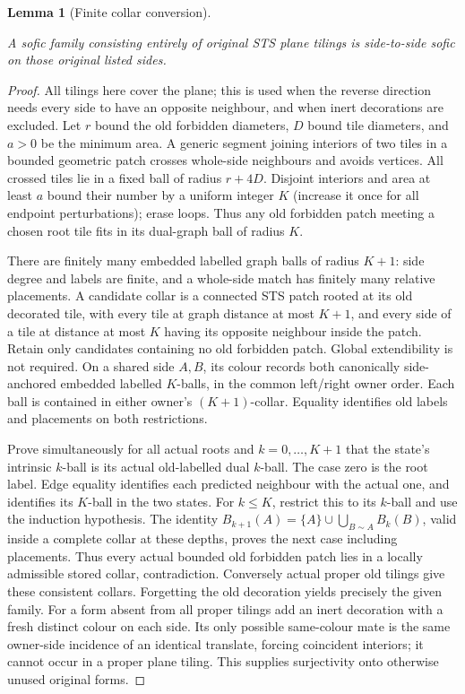 \documentclass[11pt,a4paper]{article}
\newtheorem{lemma}[definition]{Lemma}
\theoremstyle{remark}
\newcommand{\lean}[1]{}
\newcommand{\uses}[1]{}
\begin{document}
\begin{lemma}[Finite collar conversion]\label{lem:collar-conversion}
\lean{Tilings.LocalRule.side_presentation_of_sts_sofic}
\uses{def:localrule,def:sofic,def:sts,def:mesh,lem:localfinite}
A sofic family consisting entirely of original STS plane tilings is
side-to-side sofic on those original listed sides.
\end{lemma}
\begin{proof}
All tilings here cover the plane; this is used when the reverse direction
needs every side to have an opposite neighbour, and when inert decorations
are excluded. Let $r$ bound the old forbidden diameters, $D$ bound tile
diameters, and $a>0$ be the minimum area. A generic segment joining interiors of two
tiles in a bounded geometric patch crosses whole-side neighbours and avoids
vertices. All crossed tiles lie in a fixed ball of radius $r+4D$.
Disjoint interiors and area at least $a$ bound their number by a uniform
integer $K$ (increase it once for all endpoint perturbations); erase loops.
Thus any old forbidden patch meeting a chosen root tile fits in its
dual-graph ball of radius $K$.

There are finitely many embedded labelled graph balls of radius $K+1$:
side degree and labels are finite, and a whole-side match has finitely many
relative placements. A candidate collar is a connected STS patch rooted at
its old decorated tile, with every tile at graph distance at most $K+1$,
and every side of a tile at distance at most $K$ having its opposite
neighbour inside the patch. Retain only candidates containing no old
forbidden patch. Global extendibility is not required.
On a shared side $A,B$, its colour records both canonically side-anchored
embedded labelled $K$-balls, in the common left/right owner order. Each
ball is contained in either owner's $(K+1)$-collar. Equality identifies
old labels and placements on both restrictions.

Prove simultaneously for all actual roots and $k=0,\ldots,K+1$ that the
state's intrinsic $k$-ball is its actual old-labelled dual $k$-ball.
The case zero is the root label. Edge equality identifies each predicted
neighbour with the actual one, and identifies its $K$-ball in the two
states. For $k\leq K$, restrict this to its $k$-ball and use the induction
hypothesis. The identity
$B_{k+1}(A)=\{A\}\cup\bigcup_{B\sim A}B_k(B)$, valid inside a complete
collar at these depths, proves the next case including placements.
Thus every actual bounded old forbidden patch lies in a locally admissible
stored collar, contradiction. Conversely actual proper old tilings give
these consistent collars. Forgetting the old decoration yields precisely
the given family. For a form absent from all proper tilings add an inert
decoration with a fresh distinct colour on each side. Its only possible
same-colour mate is the same owner-side incidence of an identical translate,
forcing coincident interiors; it cannot occur in a proper plane tiling.
This supplies surjectivity onto otherwise unused original forms.
\end{proof}
\end{document}
